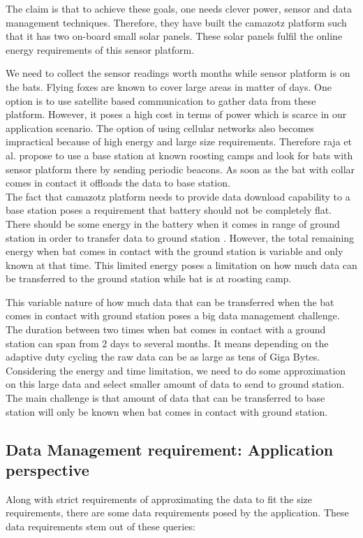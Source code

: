 \documentclass[conference]{IEEEtran}
\begin{document}
The claim is that to achieve these goals, one needs clever power, sensor and data management 
techniques. Therefore, they have built the camazotz platform such that it has two on-board small 
solar panels. These solar panels fulfil the online energy requirements of this sensor 
platform\cite{raja-ipsn}.\

We need to collect the sensor readings worth months while sensor platform is on the bats. Flying foxes 
are known to cover large areas in matter of days. One option is to use satellite based communication 
to gather data from these platform. However, it poses a high cost in terms of power which is scarce in 
our application scenario. The option of using cellular networks also becomes impractical because of 
high energy and large size requirements. Therefore raja et al. propose to use a base station at known 
roosting camps and look for bats with sensor platform there by sending periodic beacons. As soon as 
the bat with collar comes in contact it offloads the data to base station.\\
The fact that camazotz platform needs to provide data download capability to a base station 
poses a requirement that battery should not be completely flat. There should be some energy in 
the battery when it comes in range of ground station in order to transfer data to ground station
. However, the total remaining energy when bat comes in contact with the ground 
station is variable and only known at that time. This limited energy poses a limitation on 
how much data can be transferred to the ground station while bat is at roosting camp.\

This variable nature of how much data that can be transferred when the bat comes in contact with 
ground station poses a big data management challenge. The duration between two times when bat 
comes in contact with a ground station can span from 2 days to several months\cite{raja-ipsn}. 
It means depending on the adaptive duty cycling the raw data can be as large as tens of Giga 
Bytes. Considering the energy and time limitation, we need to do some approximation on this large 
data and select smaller amount of data to send to ground station. The main challenge is that amount 
of data that can be transferred to base station will only be known when bat comes in contact with 
ground station.\

\subsection{Data Management requirement: Application perspective}
Along with strict requirements of approximating the data to fit the size requirements, there are 
some data requirements posed by the application. These data requirements stem out of these queries:
\end{document}
